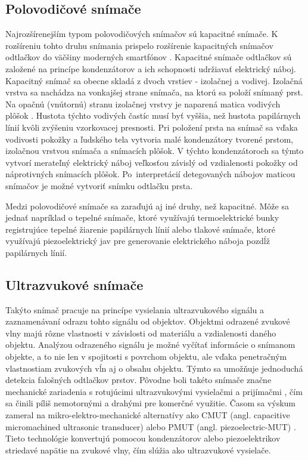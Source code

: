   \subsection{Polovodičové snímače}
  Najrozšírenejším typom polovodičových snímačov sú kapacitné snímače. K rozšíreniu tohto druhu snímania prispelo rozšírenie kapacitných snímačov odtlačkov
  do väčšiny moderných smartfónov \cite{smartphone_sensors}. Kapacitné snímače odtlačkov sú založené na princípe kondenzátorov a ich schopnosti udržiavať
  elektrický náboj. Kapacitný snímač sa obecne skladá z dvoch vrstiev - izolačnej a vodivej. Izolačná vrstva sa nachádza na vonkajšej strane
  snímača, na ktorú sa položí snímaný prst. Na opačnú (vnútornú) stranu izolačnej vrstvy je naparená matica vodivých plôšok \cite{Drahansky}. Hustota týchto
  vodivých častíc musí byť vyššia, než hustota papilárnych línií kvôli zvýšeniu vzorkovacej presnosti. Pri položení prsta na snímač sa vďaka vodivosti
  pokožky a ľudského tela vytvoria malé kondenzátory tvorené prstom, izolačnou vrstvou snímača a snímacích plôšok. V týchto kondenzátoroch sa týmto vytvorí
  merateľný elektrický náboj veľkosťou závislý od vzdialenosti pokožky od náprotivných snímacích plôšok. Po~interpretácií detegovaných nábojov maticou
  snímačov je možné vytvoriť snímku odtlačku prsta.

  Medzi polovodičové snímače sa zaraďujú aj iné druhy, než kapacitné. Môže sa jednať napríklad o tepelné snímače, ktoré využívajú termoelektrické bunky
  registrujúce tepelné žiarenie papilárnych línií alebo tlakové snímače, ktoré využívajú piezoelektrický jav pre generovanie elektrického náboja
  pozdĺž papilárnych línií.

  \subsection{Ultrazvukové snímače}
  Takýto snímač pracuje na princípe vysielania ultrazvukového signálu a zaznamenávaní odrazu tohto signálu od objektov. Objektmi odrazené zvukové vlny
  majú rôzne vlastnosti v závislosti od materiálu a vzdialenosti daného objektu. Analýzou odrazeného signálu je možné vyčítať informácie o snímanom objekte,
  a to nie len v spojitosti s povrchom objektu, ale vďaka penetračným vlastnostiam zvukových vĺn aj o obsahu objektu. Týmto sa umožňuje jednoduchá detekcia
  falošných odtlačkov prstov. Pôvodne boli takéto snímače značne mechanické zariadenia s rotujúcimi ultrazvukovými vysielačmi a prijímačmi \cite{Drahansky},
  čím sa činili píliš nemotornými a drahými pre komerčné využitie. Časom sa výskum zameral na mikro-elektro-mechanické alternatívy ako
  CMUT (angl. capacitive micromachined ultrasonic transducer) \cite{savoia2010cmut} alebo PMUT (angl. piezoelectric-MUT) \cite{tang2015pmut}. Tieto technológie
  konvertujú pomocou kondenzátorov alebo piezoelektrikov striedavé napätie na zvukové vlny, čím slúžia ako ultrazvukové vysielače.

